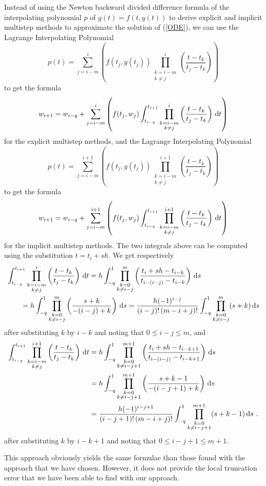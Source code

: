 \begin{rmk}
Instead of using the Newton backward divided difference formula
of the interpolating polynomial $p$ of $g(t) = f(t,y(t))$ to derive
explicit and implicit multistep methods to approximate the solution of
(\ref{ODE}), we can use the Lagrange Interpolating Polynomial
\[
p(t) = \sum_{j=i-m}^i\left( f(t_j,y(t_j)) \prod_{\substack{k=i-m\\k\neq j}}^i
\left(\frac{t-t_k}{t_j-t_k}\right) \right)
\]
to get the formula
\[
w_{i+1} = w_{i-q} + \sum_{j=i-m}^i \left( f(t_j,w_j)
\int_{t_{i-q}}^{t_{i+1}} \prod_{\substack{k=i-m\\k\neq j}}^i
\left(\frac{t-t_k}{t_j-t_k}\right) \,\mathrm{d}t \right)
\]
for the explicit multistep methods, and the Lagrange Interpolating
Polynomial
\[
p(t) = \sum_{j=i-m}^{i+1}\left( f(t_j,y(t_j))
\prod_{\substack{k=i-m\\k\neq j}}^{i+1} \left(\frac{t-t_k}{t_j-t_k}\right) \right)
\]
to get the formula
\[
w_{i+1} = w_{i-q} +
\sum_{j=i-m}^{i+1} \left( f(t_j,w_j)
\int_{t_{i-q}}^{t_{i+1}} \prod_{\substack{k=i-m\\k\neq j}}^{i+1}
\left(\frac{t-t_k}{t_j-t_k}\right) \,\mathrm{d}t \right)
\]
for the implicit multistep methods.  The two integrals above can be
computed using the substitution $t = t_i + sh$.  We get respectively
\begin{align*}
&\int_{t_{i-q}}^{t_{i+1}} \prod_{\substack{k=i-m\\k\neq j}}^i
\left(\frac{t-t_k}{t_j-t_k}\right) \,\mathrm{d}t
= h\int_{-q}^1 \prod_{\substack{k=0\\k\neq i-j}}^m
\left(\frac{t_i+sh -t_{i-k}}{t_{i-(i-j)}-t_{i-k}}\right) \,\mathrm{d}s \\
&\qquad = h \int_{-q}^1 \prod_{\substack{k=0\\k\neq i-j}}^m
\left(\frac{s+k}{-(i-j)+k}\right) \,\mathrm{d}s
= \frac{h (-1)^{i-j}}{(i-j)!\,(m-i+j)!}
\int_{-q}^1 \prod_{\substack{k=0\\k\neq i-j}}^m (s+k) \,\mathrm{d}s
\end{align*}
after substituting $k$ by $i-k$ and noting that $0 \leq i-j\leq m$,
and
\begin{align*}
\int_{t_{i-q}}^{t_{i+1}} \prod_{\substack{k=i-m\\k\neq j}}^{i+1}
\left(\frac{t-t_k}{t_j-t_k}\right) \,\mathrm{d}t
&= h\int_{-q}^1 \prod_{\substack{k=0\\k\neq i-j+1}}^{m+1}
\left(\frac{t_i+sh -t_{i-k+1}}{t_{i-(i-j)}-t_{i-k+1}}\right) \,\mathrm{d}s \\
&= h \int_{-q}^1 \prod_{\substack{k=0\\k\neq i-j+1}}^{m+1}
\left(\frac{s+k-1}{-(i-j+1)+k}\right) \,\mathrm{d}s \\
&= \frac{h (-1)^{i-j+1}}{(i-j+1)!\,(m-i+j)!}
\int_{-q}^1 \prod_{\substack{k=0\\k\neq i-j+1}}^{m+1} (s+k-1) \,\mathrm{d}s \ .
\end{align*}
after substituting $k$ by $i-k+1$ and noting that
$0 \leq i-j+1\leq m+1$.

This approach obviously yields the same formulae than those found with
the approach that we have chosen.  However, it does not provide the
local truncation error that we have been able to find with our
approach.
\end{rmk}

